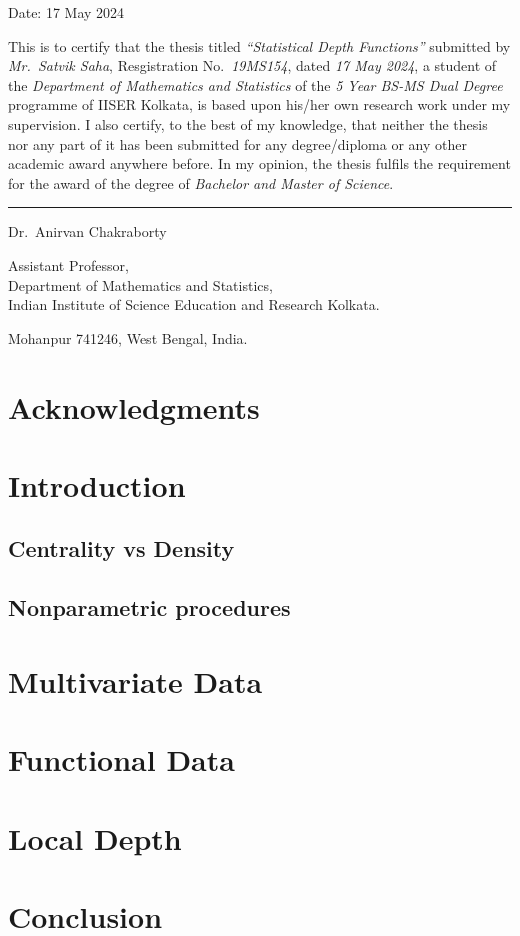 \documentclass[12pt]{report}
\begin{document}
    Date: 17 May 2024

    This is to certify that the thesis titled \emph{``Statistical Depth
    Functions''} submitted by \emph{Mr.~Satvik Saha}, Resgistration
    No.~\emph{19MS154}, dated \emph{17 May 2024}, a student of the
    \textit{Department of Mathematics and Statistics} of the \textit{5 Year
    BS-MS Dual Degree} programme of IISER Kolkata, is based upon his/her own
    research work under my supervision.
    I also certify, to the best of my knowledge, that neither the thesis nor
    any part of it has been submitted for any degree/diploma or any other
    academic award anywhere before.
    In my opinion, the thesis fulfils the requirement for the award of the
    degree of \emph{Bachelor and Master of Science}.

    \vspace{5em}
    \rule{0.4\textwidth}{0.8pt}

    \vspace{0.1em}
    Dr.~Anirvan Chakraborty

    Assistant Professor,\\
    Department of Mathematics and Statistics,\\
    Indian Institute of Science Education and Research Kolkata.

    Mohanpur 741246, West Bengal, India.



    \chapter*{Acknowledgments}


    \tableofcontents


    \chapter{Introduction}
    

    \section{Centrality vs Density}
    \section{Nonparametric procedures}


    \chapter{Multivariate Data}
    


    \chapter{Functional Data}
    

    \chapter{Local Depth}
    



    \chapter{Conclusion}
    


    \nocite{*}
    \printbibliography

    \appendix
\end{document}
